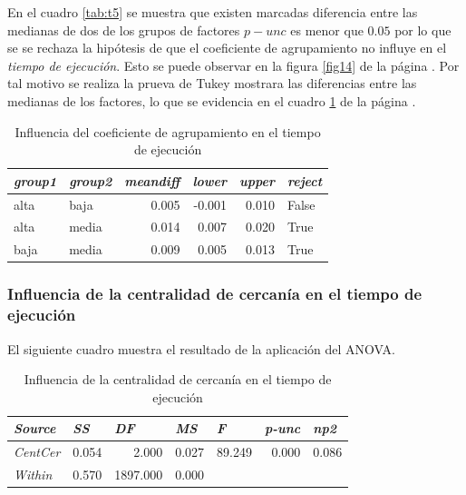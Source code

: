\documentclass{article}
\begin{document}
En el cuadro \ref{tab:t5} se muestra que existen marcadas diferencia entre las medianas de dos de los grupos de factores \textbf{$p-unc$} es menor que $0.05$ por lo que se se rechaza la hipótesis de que el coeficiente de agrupamiento no influye en el \textit{tiempo de ejecución}. Esto se puede observar en la figura \ref{fig14} de la página \pageref{fig14}. Por tal motivo se realiza la prueva de Tukey mostrara las diferencias entre las medianas de los factores, lo que se evidencia en el cuadro \ref{tab:t6} de la página \pageref{tab:t6}.

\begin{table}[htbp]
  \centering
  \caption{Influencia del coeficiente de agrupamiento en el tiempo de ejecución}
    \begin{tabular}{llrrrl}
    \toprule
    \textit{\textbf{group1}} & \textit{\textbf{group2}} & \multicolumn{1}{l}{\textit{\textbf{meandiff}}} & \multicolumn{1}{l}{\textit{\textbf{lower}}} & \multicolumn{1}{l}{\textit{\textbf{upper}}} & \textit{\textbf{reject}} \\
    \midrule
    alta  & baja  & 0.005 & -0.001 & 0.010 & False \\
    alta  & media & 0.014 & 0.007 & 0.020 & True \\
    baja  & media & 0.009 & 0.005 & 0.013 & True \\
    \bottomrule
    \end{tabular}%
  \label{tab:t6}%
\end{table}%


\subsubsection{Influencia de la centralidad de cercanía en el tiempo de ejecución}

El siguiente cuadro muestra el resultado de la aplicación del ANOVA.

\begin{table}[htbp]
  \centering
  \caption{Influencia de la centralidad de cercanía en el tiempo de ejecución}
    \begin{tabular}{lrrrrrr}
    \toprule
    \textit{\textbf{Source}} & \multicolumn{1}{l}{\textit{\textbf{SS}}} & \multicolumn{1}{l}{\textit{\textbf{DF}}} & \multicolumn{1}{l}{\textit{\textbf{MS}}} & \multicolumn{1}{l}{\textit{\textbf{F}}} & \multicolumn{1}{l}{\textit{\textbf{p-unc}}} & \multicolumn{1}{l}{\textit{\textbf{np2}}} \\
    \midrule
    \textit{CentCer} & 0.054 & 2.000 & 0.027 & 89.249 & 0.000 & 0.086 \\
    \textit{Within} & 0.570 & 1897.000 & 0.000 &       &       &  \\
    \bottomrule
    \end{tabular}%
  \label{tab:t7}%
\end{table}%
\end{document}
